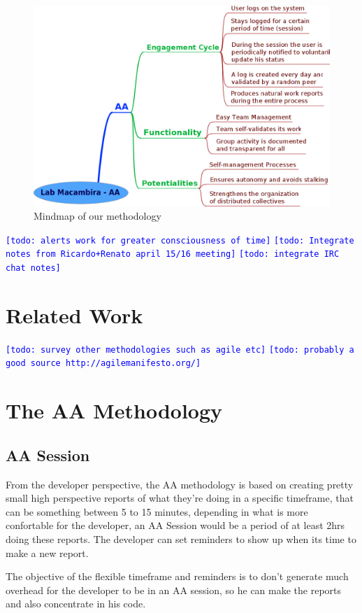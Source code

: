 \documentclass[letterpaper]{article}
\newcommand{\indraftnote}[1]{\textcolor{blue}{\texttt{\footnotesize[#1]}}}
\newcommand{\todo}[1]{\indraftnote{todo: #1}}
\begin{document}
\begin{figure}
\begin{center}
   \includegraphics[width=0.8\linewidth,keepaspectratio=true]{figs/aa-mm.png}
\end{center}
   \caption{
   Mindmap of our methodology
   }
\label{fig:mm}
\end{figure}

\todo{alerts work for greater consciousness of time}
\todo{Integrate notes from Ricardo+Renato april 15/16 meeting}
\todo{integrate IRC chat notes}

\section{Related Work}
\todo{survey other methodologies such as agile etc}
\todo{probably a good source http://agilemanifesto.org/}

\section{The AA Methodology}

\subsection{AA Session}

From the developer perspective, the AA methodology is based on creating pretty
small high perspective reports of what they're doing in a specific timeframe,
that can be something between 5 to 15 minutes, depending in what is more
confortable for the developer, an AA Session would be a period of at least 2hrs
doing these reports. The developer can set reminders to show up when its time
to make a new report.

The objective of the flexible timeframe and reminders is to don't generate much
overhead for the developer to be in an AA session, so he can make the reports
and also concentrate in his code.
\end{document}
